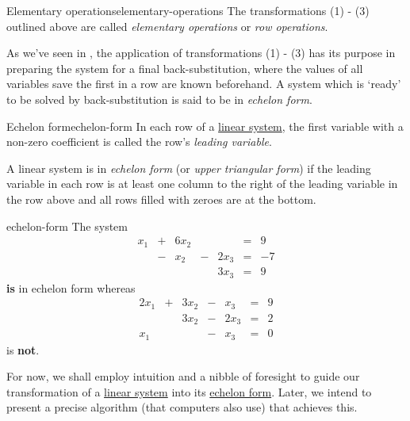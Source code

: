 \begin{definition}{Elementary operations}{elementary-operations}
 The transformations (1) - (3) outlined above are called \emph{elementary
 operations} or \emph{row operations}.
\end{definition}

As we've seen in , the application
of transformations (1) - (3) has its purpose in preparing the system for a final
back-substitution, where the values of all variables save the first in a row are
known beforehand. A system which is `ready' to be solved by back-substitution is
said to be in \emph{echelon form}.

\begin{definition}{Echelon form}{echelon-form}
 In each row of a \hyperref[def:linear-system]{linear system}, the first
 variable with a non-zero coefficient is called the row's \emph{leading
 variable}.

 A linear system is in \emph{echelon form} (or \emph{upper triangular form}) if
 the leading variable in each row is at least one column to the right of the
 leading variable in the row above and all rows filled with zeroes are at the
 bottom.
\end{definition}

\begin{example}{}{echelon-form}
 The system
 \[
  \begin{array}{rcrcrcr}
   x_1 & + & 6x_2 & & & = & 9\\
    & - & x_2 & - & 2x_3 & = & -7\\
   & & & & 3x_3 & = & 9
  \end{array}
 \]
 \textbf{is} in echelon form whereas
 \[
  \begin{array}{rcrcrcr}
   2x_1 & + & 3x_2 & - & x_3 & = & 9\\
    & & 3x_2 & - & 2x_3 & = & 2\\
    x_1 & & & - & x_3 & = & 0
  \end{array}
 \]
 is \textbf{not}.
\end{example}

For now, we shall employ intuition and a nibble of foresight to guide our
transformation of a \hyperref[def:linear-system]{linear system} into its
\hyperref[def:echelon-form]{echelon form}. Later, we intend to present a precise
algorithm (that computers also use) that achieves this.

